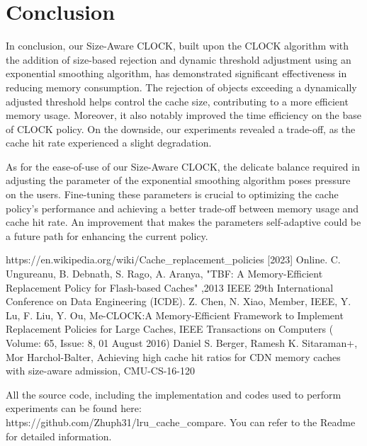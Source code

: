 \documentclass[journal,10.5pt,onecolumn]{IEEEtran}
\begin{document}
\section{Conclusion}
In conclusion, our Size-Aware CLOCK, built upon the CLOCK algorithm with the addition of size-based rejection and dynamic threshold adjustment using an exponential smoothing algorithm, has demonstrated significant effectiveness in reducing memory consumption. The rejection of objects exceeding a dynamically adjusted threshold helps control the cache size, contributing to a more efficient memory usage. Moreover, it also notably improved the time efficiency on the base of CLOCK policy. On the downside, our experiments revealed a trade-off, as the cache hit rate experienced a slight degradation.

As for the ease-of-use of our Size-Aware CLOCK, the delicate balance required in adjusting the parameter of the exponential smoothing algorithm poses pressure on the users. Fine-tuning these parameters is crucial to optimizing the cache policy's performance and achieving a better trade-off between memory usage and cache hit rate. An improvement that makes the parameters self-adaptive could be a future path for enhancing the current policy.


\begin{thebibliography}{00}
	 https://en.wikipedia.org/wiki/Cache\_replacement\_policies [2023] Online.
	 C. Ungureanu, B. Debnath, S. Rago, A. Aranya, "TBF: A Memory-Efficient Replacement Policy for Flash-based Caches" ,2013 IEEE 29th International Conference on Data Engineering (ICDE). 
	 Z. Chen, N. Xiao, Member, IEEE, Y. Lu, F. Liu, Y. Ou, Me-CLOCK:A Memory-Efficient Framework to Implement Replacement Policies for Large Caches, IEEE Transactions on Computers ( Volume: 65, Issue: 8, 01 August 2016)
	 Daniel S. Berger, Ramesh K. Sitaraman+, Mor Harchol-Balter, Achieving high cache hit ratios for CDN memory caches with size-aware admission, CMU-CS-16-120
\end{thebibliography}

\appendix 
All the source code, including the implementation and codes used to perform experiments can be found here: https://github.com/Zhuph31/lru\_cache\_compare. You can refer to the Readme for detailed information.
\end{document}
